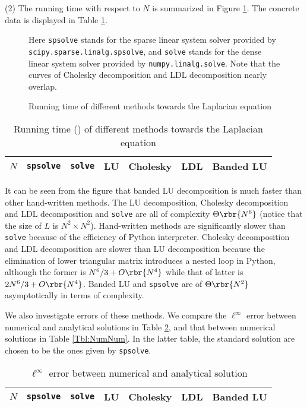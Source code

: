\documentclass[english, nochinese]{pnote}
\begin{document}
(2) The running time with respect to $N$ is summarized in Figure \ref{Fig:Time}. The concrete data is displayed in Table \ref{Tbl:RunTime}.

\begin{figure}[htb]
{
\centering

\caption{Running time of different methods towards the Laplacian equation}
\label{Fig:Time}
}
{
\small
Here \verb"spsolve" stands for the sparse linear system solver provided by \verb"scipy.sparse.linalg.spsolve", and \verb"solve" stands for the dense linear system solver provided by \verb"numpy.linalg.solve". Note that the curves of Cholesky decomposition and LDL decomposition nearly overlap.
}
\end{figure}
\begin{table}[htb]
\centering
\small
\begin{tabular}{|c|c|c|c|c|c|c|}
\hline
$N$ & \verb"spsolve" & \verb"solve" & LU & Cholesky & LDL & Banded LU \\
\hline

\end{tabular}
\caption{Running time () of different methods towards the Laplacian equation}
\label{Tbl:RunTime}
\end{table}

It can be seen from the figure that banded LU decomposition is much faster than other hand-written methods. The LU decomposition, Cholesky decomposition and LDL decomposition and \verb"solve" are all of complexity $ \Theta \rbr{N^6} $ (notice that the size of $L$ is $ N^2 \times N^2 $). Hand-written methods are significantly slower than \verb"solve" because of the efficiency of Python interpreter. Cholesky decomposition and LDL decomposition are slower than LU decomposition because the elimination of lower triangular matrix introduces a nested loop in Python, although the former is $ N^6 / 3 + O \rbr{N^4} $ while that of latter is $ 2 N^6 / 3 + O \rbr{N^4} $. Banded LU and \verb"spsolve" are of $ \Theta \rbr{N^2} $ asymptotically in terms of complexity.

We also investigate errors of these methods. We compare the $\ell^{\infty}$ error between numerical and analytical solutions in Table \ref{Tbl:NumAna}, and that between numerical solutions in Table \ref{Tbl:NumNum}. In the latter table, the standard solution are chosen to be the ones given by \verb"spsolve".

\begin{table}[htb]
\centering
\small
\begin{tabular}{|c|c|c|c|c|c|c|}
\hline
$N$ & \verb"spsolve" & \verb"solve" & LU & Cholesky & LDL & Banded LU \\
\hline

\end{tabular}
\caption{$\ell^{\infty}$ error between numerical and analytical solution}
\label{Tbl:NumAna}
\end{table}
\end{document}
